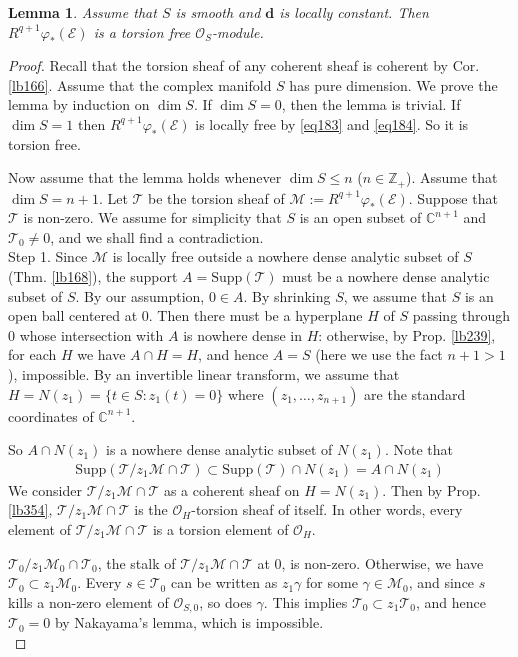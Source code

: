 \documentclass[12pt,b5paper,notitlepage]{report}
\theoremstyle{definition}
\theoremstyle{plain}
\newtheorem{lm}[df]{Lemma}
\newcommand{\scr}{\mathscr}
\newcommand{\mbf}{\mathbf}
\newcommand{\Cbb}{\mathbb C}
\newcommand{\Zbb}{\mathbb Z}
\newcommand{\Supp}{\mathrm{Supp}}
\numberwithin{equation}{section}
\begin{document}
\begin{lm}\label{lb356}
Assume that $S$ is smooth and $\mbf d$ is locally constant. Then $R^{q+1}\varphi_*(\scr E)$ is a torsion free $\scr O_S$-module. 
\end{lm}


\begin{proof}
Recall that the torsion sheaf of any coherent sheaf is coherent by Cor. \ref{lb166}. Assume that the complex manifold $S$ has pure dimension. We prove the lemma by induction on $\dim S$. If $\dim S=0$, then the lemma is trivial. If $\dim S=1$ then $R^{q+1}\varphi_*(\scr E)$ is locally free by \eqref{eq183} and \eqref{eq184}. So it is torsion free.

Now assume that the lemma holds whenever $\dim S\leq n$ ($n\in\Zbb_+$). Assume that $\dim S=n+1$. Let $\scr T$ be the torsion sheaf of $\scr M:=R^{q+1}\varphi_*(\scr E)$. Suppose that $\scr T$ is non-zero.  We assume for simplicity that $S$ is an open subset of $\Cbb^{n+1}$ and $\scr T_0\neq 0$, and we shall find a contradiction.\\

Step 1. Since $\scr M$ is locally free outside a nowhere dense analytic subset of $S$ (Thm. \ref{lb168}), the support $A=\Supp(\scr T)$ must be a nowhere dense analytic subset of $S$. By our assumption, $0\in A$. By shrinking $S$, we assume that $S$ is an open ball centered at $0$. Then there must be a hyperplane $H$ of $S$ passing through $0$ whose intersection with $A$ is nowhere dense in $H$: otherwise, by Prop. \ref{lb239}, for each $H$ we have $A\cap H=H$, and hence $A=S$ (here we use the fact $n+1>1$), impossible. By an invertible linear transform, we assume that $H=N(z_1)=\{t\in S:z_1(t)=0\}$ where $(z_1,\dots,z_{n+1})$ are the standard coordinates of $\Cbb^{n+1}$.

So $A\cap N(z_1)$ is a nowhere dense analytic subset of $N(z_1)$. Note that
\begin{align*}
\Supp(\scr T/z_1\scr M\cap\scr T)\subset\Supp(\scr T)\cap N(z_1)=A\cap N(z_1)
\end{align*}
We consider $\scr T/z_1\scr M\cap\scr T$ as a coherent sheaf on $H=N(z_1)$. Then by Prop. \ref{lb354}, $\scr T/z_1\scr M\cap\scr T$ is the $\scr O_H$-torsion sheaf of itself. In other words, every element of $\scr T/z_1\scr M\cap\scr T$ is a torsion element of $\scr O_H$.


$\scr T_0/z_1\scr M_0\cap\scr T_0$, the stalk of $\scr T/z_1\scr M\cap\scr T$ at $0$, is non-zero. Otherwise, we have $\scr T_0\subset z_1\scr M_0$. Every $s\in\scr T_0$ can be written as $z_1\gamma$ for some $\gamma\in\scr M_0$, and since $s$ kills a non-zero element of $\scr O_{S,0}$, so does $\gamma$. This implies $\scr T_0\subset z_1\scr T_0$, and hence $\scr T_0=0$ by Nakayama's lemma, which is impossible.\\


\end{proof}
\end{document}
